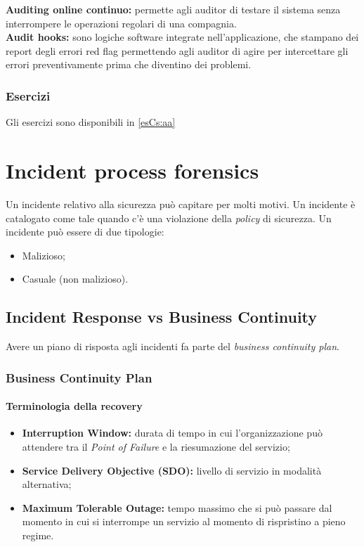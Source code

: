 \noindent \textbf{Auditing online continuo:} permette agli auditor di 
testare il sistema senza interrompere le operazioni regolari di una 
compagnia.\\
\newline
\textbf{Audit hooks:} sono logiche software integrate nell'applicazione, che
stampano dei report degli errori red flag permettendo agli auditor di agire
per intercettare gli errori preventivamente prima che diventino dei problemi.

\section{Esercizi}

Gli esercizi sono disponibili in \ref{esCs:aa}

\part{Incident process forensics}

Un incidente relativo alla sicurezza può capitare per molti motivi. Un
incidente è catalogato come tale quando c'è una violazione della
\textit{policy} di sicurezza. Un incidente può essere di due tipologie:
\begin{itemize}
\item Malizioso;
\item Casuale (non malizioso).
\end{itemize}

\chapter{Incident Response vs Business Continuity}
\label{IRBC}

Avere un piano di risposta agli incidenti fa parte del \textit{business
continuity plan}.

\section{Business Continuity Plan}

\subsection{Terminologia della recovery}

\begin{itemize}
\item \textbf{Interruption Window:} durata di tempo in cui l'organizzazione
può attendere tra il \textit{Point of Failure} e la riesumazione del servizio;
\item \textbf{Service Delivery Objective (SDO):} livello di servizio in
modalità alternativa;
\item \textbf{Maximum Tolerable Outage:} tempo massimo che si può passare dal
momento in cui si interrompe un servizio al momento di rispristino a pieno 
regime.
\end{itemize}

